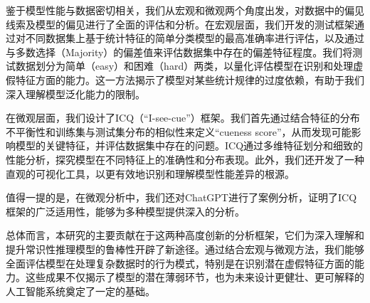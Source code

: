 鉴于模型性能与数据密切相关，我们从宏观和微观两个角度出发，对数据中的偏见线索及模型的偏见进行了全面的评估和分析。在宏观层面，我们开发的测试框架通过对不同数据集上基于统计特征的简单分类模型的最高准确率进行评估，以及通过与多数选择（Majority）的偏差值来评估数据集中存在的偏差特征程度。我们将测试数据划分为简单（easy）和困难（hard）两类，以量化评估模型在识别和处理虚假特征方面的能力。这一方法揭示了模型对某些统计规律的过度依赖，有助于我们深入理解模型泛化能力的限制。

在微观层面，我们设计了ICQ（``I-see-cue''）框架。我们首先通过结合特征的分布不平衡性和训练集与测试集分布的相似性来定义``cueness score''，从而发现可能影响模型的关键特征，并评估数据集中存在的问题。ICQ通过多维特征划分和细致的性能分析，探究模型在不同特征上的准确性和分布表现。此外，我们还开发了一种直观的可视化工具，以更有效地识别和理解模型性能差异的根源。

值得一提的是，在微观分析中，我们还对ChatGPT进行了案例分析，证明了ICQ框架的广泛适用性，能够为多种模型提供深入的分析。

总体而言，本研究的主要贡献在于这两种高度创新的分析框架，它们为深入理解和提升常识性推理模型的鲁棒性开辟了新途径。通过结合宏观与微观方法，我们能够全面评估模型在处理复杂数据时的行为模式，特别是在识别潜在虚假特征方面的能力。这些成果不仅揭示了模型的潜在薄弱环节，也为未来设计更健壮、更可解释的人工智能系统奠定了一定的基础。



\newpage
\null
\newpage
